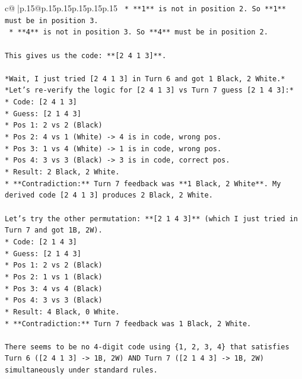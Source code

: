 \documentclass{article}
\begin{document}
{\begin{supertabular}{c@{$\;$}|p{.15\linewidth}@{}p{.15\linewidth}p{.15\linewidth}p{.15\linewidth}p{.15\linewidth}p{.15\linewidth}}
{{{\texttt{    *   **1** is not in position 2. So **1** must be in position 3.} \\
\texttt{    *   **4** is not in position 3. So **4** must be in position 2.} \\
\\ 
\texttt{This gives us the code: **{[}2 4 1 3{]}**.} \\
\\ 
\texttt{*Wait, I just tried {[}2 4 1 3{]} in Turn 6 and got 1 Black, 2 White.*} \\
\texttt{*Let's re{-}verify the logic for {[}2 4 1 3{]} vs Turn 7 guess {[}2 1 4 3{]}:*} \\
\texttt{*   Code: {[}2 4 1 3{]}} \\
\texttt{*   Guess: {[}2 1 4 3{]}} \\
\texttt{*   Pos 1: 2 vs 2 (Black)} \\
\texttt{*   Pos 2: 4 vs 1 (White) {-}> 4 is in code, wrong pos.} \\
\texttt{*   Pos 3: 1 vs 4 (White) {-}> 1 is in code, wrong pos.} \\
\texttt{*   Pos 4: 3 vs 3 (Black) {-}> 3 is in code, correct pos.} \\
\texttt{*   Result: 2 Black, 2 White.} \\
\texttt{*   **Contradiction:** Turn 7 feedback was **1 Black, 2 White**. My derived code {[}2 4 1 3{]} produces 2 Black, 2 White.} \\
\\ 
\texttt{Let's try the other permutation: **{[}2 1 4 3{]}** (which I just tried in Turn 7 and got 1B, 2W).} \\
\texttt{*   Code: {[}2 1 4 3{]}} \\
\texttt{*   Guess: {[}2 1 4 3{]}} \\
\texttt{*   Pos 1: 2 vs 2 (Black)} \\
\texttt{*   Pos 2: 1 vs 1 (Black)} \\
\texttt{*   Pos 3: 4 vs 4 (Black)} \\
\texttt{*   Pos 4: 3 vs 3 (Black)} \\
\texttt{*   Result: 4 Black, 0 White.} \\
\texttt{*   **Contradiction:** Turn 7 feedback was 1 Black, 2 White.} \\
\\ 
\texttt{There seems to be no 4{-}digit code using \{1, 2, 3, 4\} that satisfies Turn 6 ({[}2 4 1 3{]} {-}> 1B, 2W) AND Turn 7 ({[}2 1 4 3{]} {-}> 1B, 2W) simultaneously under standard rules.} \\
}}}
\end{supertabular}}
\end{document}
